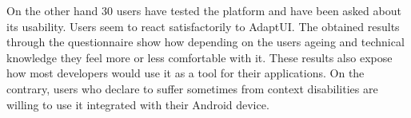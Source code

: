 On the other hand 30 users have tested the platform and have been asked about 
its usability. Users seem to react satisfactorily to AdaptUI. The obtained 
results through the questionnaire show how depending on the users ageing and 
technical knowledge they feel more or less comfortable with it. These results
also expose how most developers would use it as a tool for their applications. 
On the contrary, users who declare to suffer sometimes from context disabilities 
are willing to use it integrated with their Android device.

% 
% 
% 
